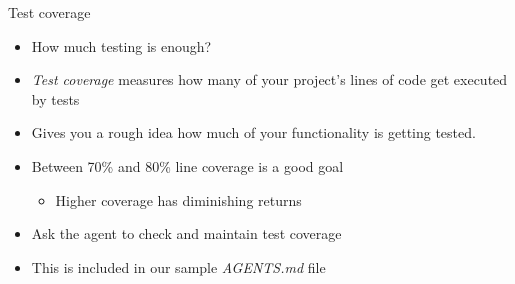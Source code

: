 \documentclass[
ps,
]{prosper}
\begin{document}
\begin{slide}{Test coverage}

\begin{itemize}

\item How much testing is enough?

\item \textit{Test coverage} measures how many of your project's lines of code
  get executed by tests
  
\item Gives you a rough idea how much of your functionality is getting tested.

\item Between 70\% and 80\% line coverage is a good goal

  \begin{itemize}

  \item Higher coverage has diminishing returns

  \end{itemize}
  
  \item Ask the agent to check and maintain test coverage

  \item This is included in our sample \textit{AGENTS.md} file

\end{itemize}

\end{slide}
\end{document}
